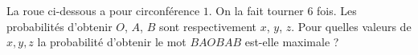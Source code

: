 La roue ci-dessous a pour circonférence $1$. On la fait tourner $6$ fois. Les probabilités d'obtenir $O$, $A$, $B$ sont respectivement $x$, $y$, $z$. Pour quelles valeurs de $x, y, z$ la probabilité d'obtenir le mot $BAOBAB$ est-elle maximale ?

\begin{center}
\end{center}

